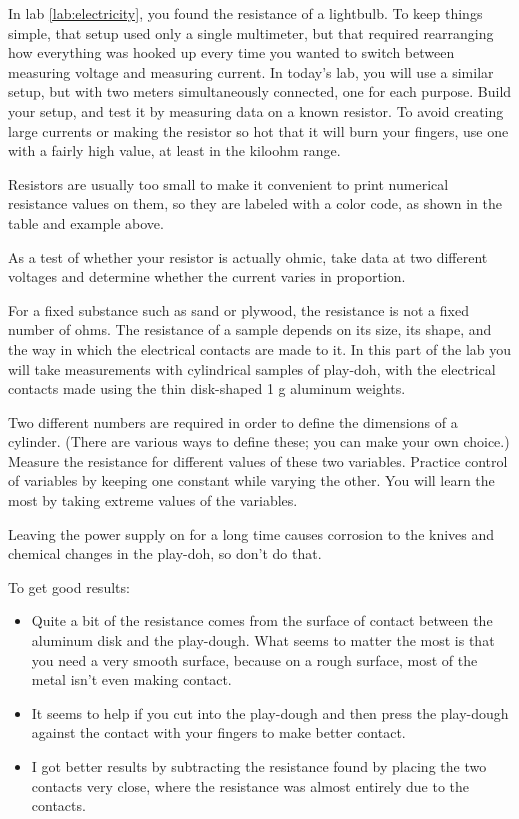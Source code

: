 \observations


In lab \ref{lab:electricity}, you found the resistance of a lightbulb.
To keep things simple, that setup used only a single multimeter, but
that required rearranging how everything was hooked up every time you
wanted to switch between measuring voltage and measuring current.
In today's lab, you will use a similar setup, but with two meters simultaneously connected, one for each purpose.
Build your setup, and test it by measuring data on a known resistor.
To avoid creating large currents or making the resistor so hot that it
will burn your fingers, use one with a fairly high value, at least in
the kiloohm range.

Resistors are usually too small to make it convenient to
print numerical resistance values on them, so they are
labeled with a color code, as shown in the table and example above.


As a test of whether your resistor is actually ohmic, take data
at two different voltages and determine whether the current varies
in proportion.


For a fixed substance such as sand or plywood, the resistance is not
a fixed number of ohms. The resistance of a sample depends on its size,
its shape, and the way in which the electrical contacts are made to it.
In this part of the lab you will take measurements with cylindrical samples of play-doh,
with the electrical contacts made using the thin disk-shaped 1 g aluminum weights.

Two different numbers are required in order to define the dimensions of a cylinder.
(There are various ways to define these; you can make your own choice.)
Measure the resistance for different values of these two variables.
Practice control of variables by keeping one constant while varying the other.
You will learn the most by taking extreme values of the variables.

Leaving the power supply on for a long time causes corrosion to the knives
and chemical changes in the play-doh, so don't do that.

To get good results:
\begin{itemize}
\item[] Quite a bit of the resistance comes from the surface of contact between the aluminum disk
and the play-dough. What seems to
matter the most is that you need a very smooth surface, because on a rough surface, most of the
metal isn't even making contact.
\item[] It seems to help if you cut into the play-dough and then press the play-dough against the
contact with your fingers to make better contact.
\item[] I got better results by subtracting the resistance found by placing the two contacts
very close, where the resistance was almost entirely due to the contacts.
\end{itemize}


